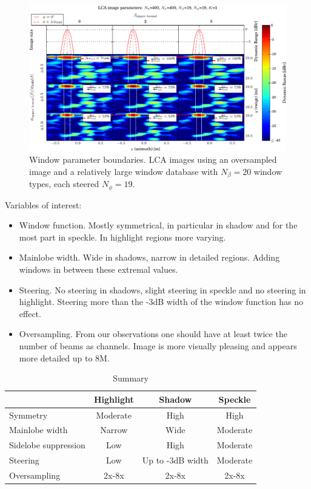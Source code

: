 \documentclass[10pt,journal,draftclsnofoot,onecolumn]{IEEEtran}
\let\MYoriglatexcaption\caption               %
\renewcommand{\caption}[2][\relax]{\MYoriglatexcaption[#2]{#2}}
\newcommand\1{\vec 1}
\begin{document}
\newpage
\begin{figure}[tbhp!]%
\includegraphics[width=\textwidth]{gfx/oversampling_mosaic_bounds.pdf}%
\caption{Window parameter boundaries. LCA images using an oversampled image and a relatively large window database with $N_\beta=20$ window types, each steered $N_\phi=19$. }\label{oversampling_mosaic_bounds_beta}
\end{figure}


Variables of interest:

\begin{itemize}
\item Window function. Mostly symmetrical, in particular in shadow and for the most part in speckle. In highlight regions more varying.
\item Mainlobe width. Wide in shadows, narrow in detailed regions. Adding windows in between these extremal values.
\item Steering. No steering in shadows, slight steering in speckle and no steering in highlight. Steering more than the -3dB width of the window function has no effect.
\item Oversampling. From our observations one should have at least twice the number of beams as channels. Image is more visually pleasing and appears more detailed up to 8M.
\end{itemize}
\begin{table}[!b]\centering%
\begin{tabular}[c]{l c c c}\hline
\rowcolor{tabBlue} & \bf Highlight & \bf Shadow & \bf Speckle  \\\hline
Symmetry             & Moderate  & High   & High \\
Mainlobe width       & Narrow    & Wide   & Moderate \\
Sidelobe suppression & Low       & High   & Moderate \\
Steering             & Low       & Up to -3dB width & Moderate \\
Oversampling         & 2x-8x     & 2x-8x  & 2x-8x
\end{tabular}
\caption{Summary}\label{tab:summary}
\end{table}%
\end{document}
